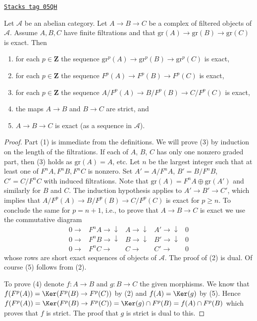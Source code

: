 \begin{lemma}
\label{homology-lemma-filtered-acyclic}
\href{https://stacks.math.columbia.edu/tag/05QH}{\texttt{Stacks tag 05QH}}

Let $\mathcal{A}$ be an abelian category.
Let $A \to B \to C$ be a complex of filtered objects of $\mathcal{A}$.
Assume $A, B, C$ have finite filtrations and that
$\text{gr}(A) \to \text{gr}(B) \to \text{gr}(C)$ is exact.
Then
\begin{enumerate}
\item for each $p \in \mathbf{Z}$ the sequence
$\text{gr}^p(A) \to \text{gr}^p(B) \to \text{gr}^p(C)$ is exact,
\item for each $p \in \mathbf{Z}$ the sequence
$F^p(A) \to F^p(B) \to F^p(C)$ is exact,
\item for each $p \in \mathbf{Z}$ the sequence
$A/F^p(A) \to B/F^p(B) \to C/F^p(C)$ is exact,
\item the maps $A \to B$ and $B \to C$ are strict, and
\item $A \to B \to C$ is exact (as a sequence in $\mathcal{A}$).
\end{enumerate}
\end{lemma}

\begin{proof}
Part (1) is immediate from the definitions.
We will prove (3) by induction on the length of the filtrations.
If each of $A$, $B$, $C$ has only one
nonzero graded part, then (3) holds as $\text{gr}(A) = A$, etc.
Let $n$ be the largest integer such that at least one of
$F^nA, F^nB, F^nC$ is nonzero. Set $A' = A/F^nA$, $B' = B/F^nB$,
$C' = C/F^nC$ with induced filtrations. Note that
$\text{gr}(A) = F^nA \oplus \text{gr}(A')$
and similarly for $B$ and $C$. The induction hypothesis
applies to $A' \to B' \to C'$, which implies that
$A/F^p(A) \to B/F^p(B) \to C/F^p(C)$ is exact for $p \geq n$.
To conclude the same for $p = n + 1$, i.e., to prove that $A \to B \to C$
is exact we use the commutative diagram
$$
\begin{array}{ccccc}0 \longrightarrow & F^nA \longrightarrow\downarrow & A \longrightarrow\downarrow & A' \longrightarrow\downarrow & 0 \\ 0 \longrightarrow & F^nB \longrightarrow\downarrow & B \longrightarrow\downarrow & B' \longrightarrow\downarrow & 0 \\ 0 \longrightarrow & F^nC \longrightarrow & C \longrightarrow & C' \longrightarrow & 0\end{array}
$$
whose rows are short exact sequences of objects of $\mathcal{A}$.
The proof of (2) is dual. Of course (5) follows from (2).

\medskip\noindent
To prove (4) denote $f : A \to B$ and $g : B \to C$ the given morphisms.
We know that $f(F^p(A)) = \Ker(F^p(B) \to F^p(C))$ by (2) and
$f(A) = \Ker(g)$ by (5). Hence
$f(F^p(A)) =  \Ker(F^p(B) \to F^p(C)) =
\Ker(g) \cap F^p(B) = f(A) \cap F^p(B)$ which proves that
$f$ is strict. The proof that $g$ is strict is dual to this.
\end{proof}

